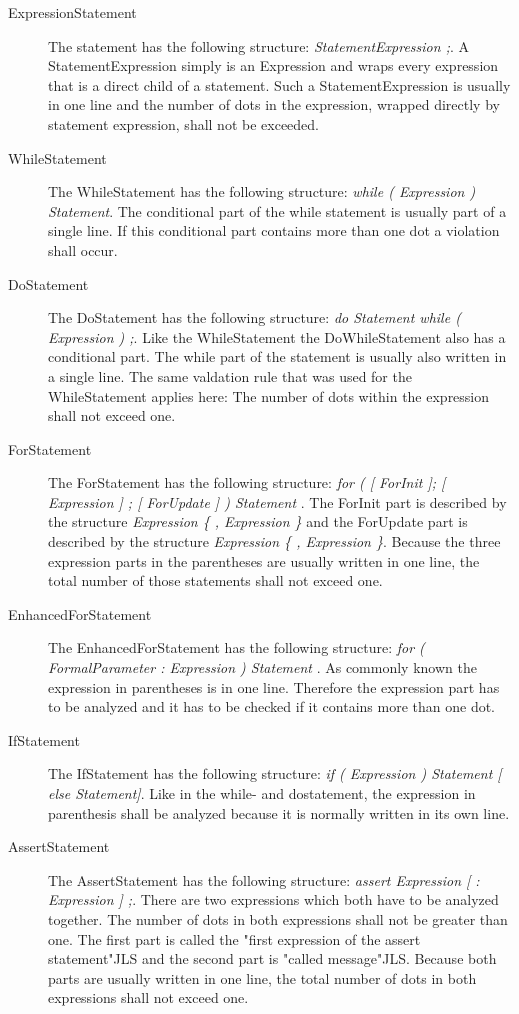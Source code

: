 \begin{description}
  \item[ExpressionStatement] The statement has the following structure: \textit{ StatementExpression ;}. A StatementExpression simply is an Expression and wraps every expression that is a direct child of a statement. Such a StatementExpression is usually in one line and the number of dots in the expression, wrapped directly by statement expression, shall not be exceeded.
  \item[WhileStatement] The WhileStatement  has the following structure: \textit{while ( Expression ) Statement}. The conditional part of the while statement is usually part of a single line. If this conditional part contains more than one dot a violation shall occur.
  \item[DoStatement] The DoStatement has the following structure: \textit{do Statement while ( Expression ) ;}. Like the WhileStatement the DoWhileStatement also has a conditional part. The while part of the statement is usually also written in a single line. The same valdation rule that was used for the WhileStatement applies here: The number of dots within the expression shall not exceed one.
  \item[ForStatement] The ForStatement has the following structure: \textit{for ( [ ForInit ]; [ Expression ] ; [ ForUpdate ] ) Statement  
  }. The ForInit part is described by the structure \textit{Expression \{ , Expression \}} and the ForUpdate  part is described by the structure \textit{ Expression \{ , Expression \}}. Because the three expression parts in the parentheses are usually written in one line, the total number of those statements shall not exceed one. 
  \item[EnhancedForStatement] The EnhancedForStatement has the following structure: \textit{for ( FormalParameter : Expression ) Statement }. As commonly known the expression in parentheses is in one line. Therefore the expression part has to be analyzed and it has to be checked if it contains more than one dot.
  \item[IfStatement] The IfStatement has the following structure: \textit{if ( Expression ) Statement [ else Statement]}. Like in the while- and dostatement, the expression in parenthesis shall be analyzed because it is normally written in its own line. 
  \item[AssertStatement] The AssertStatement  has the following structure: \textit{assert Expression [ : Expression ] ;}. There are two expressions which both have to be analyzed together. The number of dots in both expressions shall not be greater than one. The first part is called the "first expression of the assert statement"\ac{JLS} and the second part is "called message"\ac{JLS}. Because both parts are usually written in one line, the total number of dots in both expressions shall not exceed one.

\end{description}
